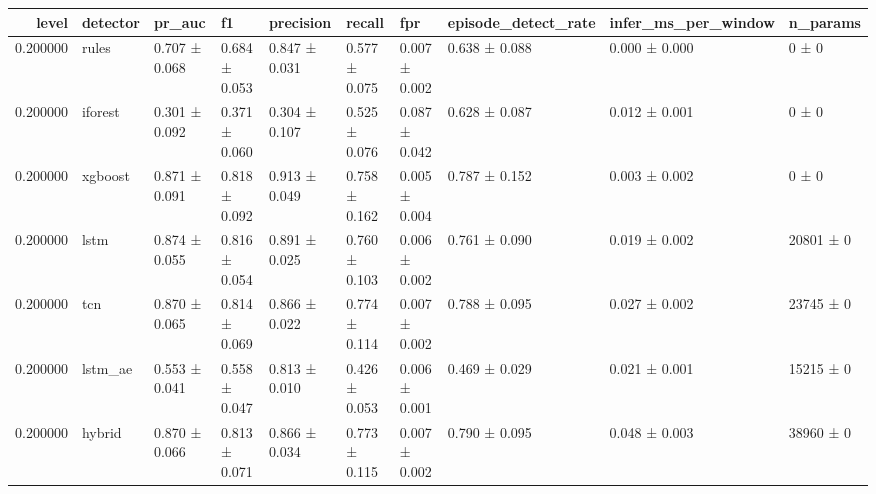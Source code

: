 \begin{tabular}{rlllllllll}
\toprule
level & detector & pr\_auc & f1 & precision & recall & fpr & episode\_detect\_rate & infer\_ms\_per\_window & n\_params \\
\midrule
0.200000 & rules & 0.707 ± 0.068 & 0.684 ± 0.053 & 0.847 ± 0.031 & 0.577 ± 0.075 & 0.007 ± 0.002 & 0.638 ± 0.088 & 0.000 ± 0.000 & 0 ± 0 \\
0.200000 & iforest & 0.301 ± 0.092 & 0.371 ± 0.060 & 0.304 ± 0.107 & 0.525 ± 0.076 & 0.087 ± 0.042 & 0.628 ± 0.087 & 0.012 ± 0.001 & 0 ± 0 \\
0.200000 & xgboost & 0.871 ± 0.091 & 0.818 ± 0.092 & 0.913 ± 0.049 & 0.758 ± 0.162 & 0.005 ± 0.004 & 0.787 ± 0.152 & 0.003 ± 0.002 & 0 ± 0 \\
0.200000 & lstm & 0.874 ± 0.055 & 0.816 ± 0.054 & 0.891 ± 0.025 & 0.760 ± 0.103 & 0.006 ± 0.002 & 0.761 ± 0.090 & 0.019 ± 0.002 & 20801 ± 0 \\
0.200000 & tcn & 0.870 ± 0.065 & 0.814 ± 0.069 & 0.866 ± 0.022 & 0.774 ± 0.114 & 0.007 ± 0.002 & 0.788 ± 0.095 & 0.027 ± 0.002 & 23745 ± 0 \\
0.200000 & lstm\_ae & 0.553 ± 0.041 & 0.558 ± 0.047 & 0.813 ± 0.010 & 0.426 ± 0.053 & 0.006 ± 0.001 & 0.469 ± 0.029 & 0.021 ± 0.001 & 15215 ± 0 \\
0.200000 & hybrid & 0.870 ± 0.066 & 0.813 ± 0.071 & 0.866 ± 0.034 & 0.773 ± 0.115 & 0.007 ± 0.002 & 0.790 ± 0.095 & 0.048 ± 0.003 & 38960 ± 0 \\
\bottomrule
\end{tabular}
